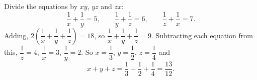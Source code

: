 Divide the equations by $xy$, $yz$ and $zx$:
\[
\dfrac{1}{x}+\dfrac{1}{y}=5,\qquad \dfrac{1}{y}+\dfrac{1}{z}=6,\qquad \dfrac{1}{z}+\dfrac{1}{x}=7 .
\]
Adding, $2\left(\dfrac{1}{x}+\dfrac{1}{y}+\dfrac{1}{z}\right)=18$, so $\dfrac{1}{x}+\dfrac{1}{y}+\dfrac{1}{z}=9$. Subtracting each equation from this, $\dfrac{1}{z}=4$, $\dfrac{1}{x}=3$, $\dfrac{1}{y}=2$. So $x=\dfrac{1}{3}$, $y=\dfrac{1}{2}$, $z=\dfrac{1}{4}$ and
\[
x+y+z=\dfrac{1}{3}+\dfrac{1}{2}+\dfrac{1}{4}=\boxed{\dfrac{13}{12}} .
\]
